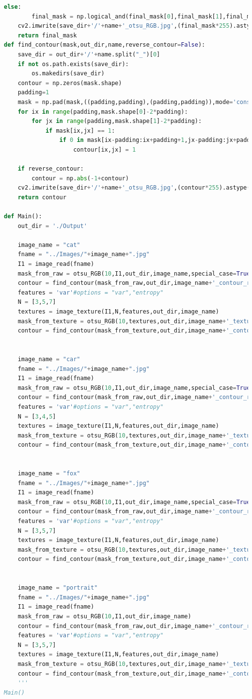 \documentclass{article}
\begin{document}
\begin{lstlisting}[language=Python]
	else:
		final_mask = np.logical_and(final_mask[0],final_mask[1],final_mask[2])
	cv2.imwrite(save_dir+'/'+name+'_otsu_RGB.jpg',(final_mask*255).astype(np.uint8))
	return final_mask
def find_contour(mask,out_dir,name,reverse_contour=False):
	save_dir = out_dir+'/'+name.split("_")[0]
	if not os.path.exists(save_dir):
		os.makedirs(save_dir)
	contour = np.zeros(mask.shape)
	padding=1
	mask = np.pad(mask,((padding,padding),(padding,padding)),mode='constant',constant_values=0)
	for ix in range(padding,mask.shape[0]-2*padding):
		for jx in range(padding,mask.shape[1]-2*padding):
			if mask[ix,jx] == 1:
				if 0 in mask[ix-padding:ix+padding+1,jx-padding:jx+padding+1]:
					contour[ix,jx] = 1

	if reverse_contour:
		contour = np.abs(-1+contour)
	cv2.imwrite(save_dir+'/'+name+'_otsu_RGB.jpg',(contour*255).astype(np.uint8))
	return contour

def Main():
	out_dir = './Output'

	image_name = "cat"
	fname = "../Images/"+image_name+".jpg"
	I1 = image_read(fname)
	mask_from_raw = otsu_RGB(10,I1,out_dir,image_name,special_case=True)
	contour = find_contour(mask_from_raw,out_dir,image_name+'_contour_raw')
	features = 'var'#options = "var","entropy"
	N = [3,5,7]
	textures = image_texture(I1,N,features,out_dir,image_name)
	mask_from_texture = otsu_RGB(10,textures,out_dir,image_name+'_texture')
	contour = find_contour(mask_from_texture,out_dir,image_name+'_contour_texture')


	image_name = "car"
	fname = "../Images/"+image_name+".jpg"
	I1 = image_read(fname)
	mask_from_raw = otsu_RGB(10,I1,out_dir,image_name,special_case=True)
	contour = find_contour(mask_from_raw,out_dir,image_name+'_contour_raw')
	features = 'var'#options = "var","entropy"
	N = [3,4,5]
	textures = image_texture(I1,N,features,out_dir,image_name)
	mask_from_texture = otsu_RGB(10,textures,out_dir,image_name+'_texture')
	contour = find_contour(mask_from_texture,out_dir,image_name+'_contour_texture')


	image_name = "fox"
	fname = "../Images/"+image_name+".jpg"
	I1 = image_read(fname)
	mask_from_raw = otsu_RGB(10,I1,out_dir,image_name,special_case=True)
	contour = find_contour(mask_from_raw,out_dir,image_name+'_contour_raw')
	features = 'var'#options = "var","entropy"
	N = [3,5,7]
	textures = image_texture(I1,N,features,out_dir,image_name)
	mask_from_texture = otsu_RGB(10,textures,out_dir,image_name+'_texture')
	contour = find_contour(mask_from_texture,out_dir,image_name+'_contour_texture')


	image_name = "portrait"
	fname = "../Images/"+image_name+".jpg"
	I1 = image_read(fname)
	mask_from_raw = otsu_RGB(10,I1,out_dir,image_name)
	contour = find_contour(mask_from_raw,out_dir,image_name+'_contour_raw')
	features = 'var'#options = "var","entropy"
	N = [3,5,7]
	textures = image_texture(I1,N,features,out_dir,image_name)
	mask_from_texture = otsu_RGB(10,textures,out_dir,image_name+'_texture')
	contour = find_contour(mask_from_texture,out_dir,image_name+'_contour_texture')
	'''
Main()

\end{lstlisting}
\end{document}
